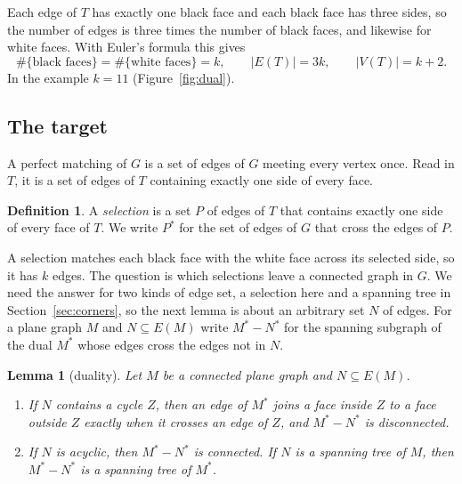 \documentclass[10pt]{amsart}
\numberwithin{equation}{section}
\newtheorem{lemma}[equation]{Lemma}
\theoremstyle{definition}
\newtheorem{definition}[equation]{Definition}
\theoremstyle{remark}
\newcommand{\T}{T}
\begin{document}
Each edge of $\T$ has exactly one black face and each black face has three sides, so the number of edges is three times the number of black faces, and likewise for white faces.
With Euler's formula this gives
\begin{equation}\label{eq:counts}
\#\{\text{black faces}\}=\#\{\text{white faces}\}=k,\qquad |E(\T)|=3k,\qquad |V(\T)|=k+2 .
\end{equation}
In the example $k=11$ (Figure~\ref{fig:dual}).

\subsection*{The target}
A perfect matching of $G$ is a set of edges of $G$ meeting every vertex once.
Read in $\T$, it is a set of edges of $\T$ containing exactly one side of every face.

\begin{definition}
A \emph{selection} is a set $P$ of edges of $\T$ that contains exactly one side of every face of $\T$.
We write $P^*$ for the set of edges of $G$ that cross the edges of $P$.
\end{definition}

A selection matches each black face with the white face across its selected side, so it has $k$ edges.
The question is which selections leave a connected graph in $G$.
We need the answer for two kinds of edge set, a selection here and a spanning tree in Section~\ref{sec:corners}, so the next lemma is about an arbitrary set $N$ of edges.
For a plane graph $M$ and $N\subseteq E(M)$ write $M^*-N^*$ for the spanning subgraph of the dual $M^*$ whose edges cross the edges not in $N$.

\begin{lemma}[duality]\label{lem:duality}
Let $M$ be a connected plane graph and $N\subseteq E(M)$.
\begin{enumerate}
\item If $N$ contains a cycle $Z$, then an edge of $M^*$ joins a face inside $Z$ to a face outside $Z$ exactly when it crosses an edge of $Z$, and $M^*-N^*$ is disconnected.
\item If $N$ is acyclic, then $M^*-N^*$ is connected. If $N$ is a spanning tree of $M$, then $M^*-N^*$ is a spanning tree of $M^*$.
\end{enumerate}
\end{lemma}
\end{document}
